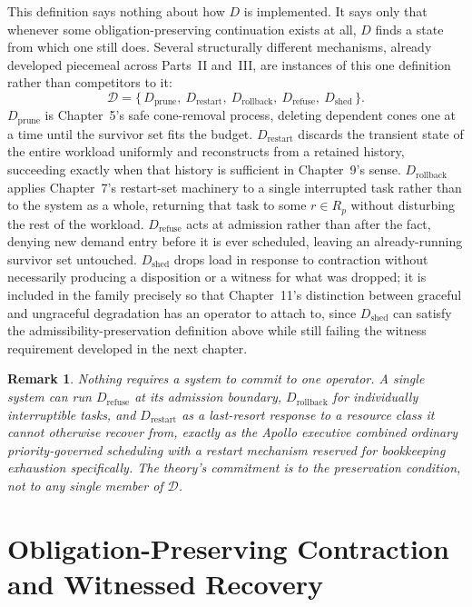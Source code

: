 \documentclass[11pt]{report}
\newtheorem{remark}[definition]{Remark}
\begin{document}
This definition says nothing about how $D$ is implemented. It says only that whenever some obligation-preserving continuation exists at all, $D$ finds a state from which one still does. Several structurally different mechanisms, already developed piecemeal across Parts~II and~III, are instances of this one definition rather than competitors to it:
\[
\mathcal D = \{\, D_{\mathrm{prune}},\ D_{\mathrm{restart}},\ D_{\mathrm{rollback}},\ D_{\mathrm{refuse}},\ D_{\mathrm{shed}} \,\}.
\]
$D_{\mathrm{prune}}$ is Chapter~5's safe cone-removal process, deleting dependent cones one at a time until the survivor set fits the budget. $D_{\mathrm{restart}}$ discards the transient state of the entire workload uniformly and reconstructs from a retained history, succeeding exactly when that history is sufficient in Chapter~9's sense. $D_{\mathrm{rollback}}$ applies Chapter~7's restart-set machinery to a single interrupted task rather than to the system as a whole, returning that task to some $r \in R_p$ without disturbing the rest of the workload. $D_{\mathrm{refuse}}$ acts at admission rather than after the fact, denying new demand entry before it is ever scheduled, leaving an already-running survivor set untouched. $D_{\mathrm{shed}}$ drops load in response to contraction without necessarily producing a disposition or a witness for what was dropped; it is included in the family precisely so that Chapter~11's distinction between graceful and ungraceful degradation has an operator to attach to, since $D_{\mathrm{shed}}$ can satisfy the admissibility-preservation definition above while still failing the witness requirement developed in the next chapter.

\begin{remark}
Nothing requires a system to commit to one operator. A single system can run $D_{\mathrm{refuse}}$ at its admission boundary, $D_{\mathrm{rollback}}$ for individually interruptible tasks, and $D_{\mathrm{restart}}$ as a last-resort response to a resource class it cannot otherwise recover from, exactly as the Apollo executive combined ordinary priority-governed scheduling with a restart mechanism reserved for bookkeeping exhaustion specifically. The theory's commitment is to the preservation condition, not to any single member of $\mathcal D$.
\end{remark}

\chapter{Obligation-Preserving Contraction and Witnessed Recovery}
\end{document}
